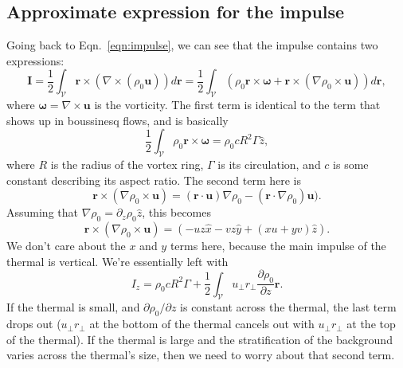\documentclass[onecolumn, amsmath, amsfonts, amssymb]{aastex62}
\newcommand{\grad}{\ensuremath{\nabla}}
\begin{document}
\subsection{Approximate expression for the impulse}
Going back to Eqn.~\ref{eqn:impulse}, we can see that the impulse contains two expressions:
\begin{equation}
\bm{I} = \frac{1}{2}\int_{\mathcal{V}}\bm{r}\times(\grad\times(\rho_0\bm{u}))d\bm{r} 
= \frac{1}{2} \int_{\mathcal{V}} \left(\rho_0 \bm{r}\times \bm{\omega} + \bm{r} \times(\grad\rho_0 \times \bm{u}) \right) d\bm{r},
\end{equation}
where $\bm{\omega} = \grad\times\bm{u}$ is the vorticity.  The first term is identical to the term that shows up
in boussinesq flows, and is basically \citep{saffman1970}
$$
\frac{1}{2} \int_{\mathcal{V}} \rho_0 \bm{r}\times \bm{\omega} = \rho_0 c R^2 \Gamma \hat{z},
$$
where $R$ is the radius of the vortex ring, $\Gamma$ is its circulation, and $c$ is some constant describing its
aspect ratio. The second term here is
$$
\bm{r}\times(\grad\rho_0 \times\bm{u}) = (\bm{r}\cdot\bm{u})\grad\rho_0 - (\bm{r}\cdot\grad\rho_0)\bm{u}).
$$
Assuming that $\grad \rho_0 = \partial_z \rho_0 \hat{z}$, this becomes
$$
\bm{r}\times(\grad\rho_0 \times\bm{u}) = (-uz\hat{x} - vz\hat{y} + (xu + yv)\hat{z}).
$$
We don't care about the $x$ and $y$ terms here, because the main impulse of the thermal is vertical. We're essentially left with
$$
I_z = \rho_0 c R^2 \Gamma + \frac{1}{2}\int_{\mathcal{V}} u_{\perp} r_{\perp} \frac{\partial \rho_0}{\partial z} \bm{r}.
$$
If the thermal is small, and $\partial \rho_0 /\partial z$ is constant across the thermal, the last term drops out
($u_{\perp} r_{\perp}$ at the bottom of the thermal cancels out with $u_{\perp} r_{\perp}$ at the top of the thermal).
If the thermal is large and the stratification of the background varies across the thermal's size, then we need to worry
about that second term.


\end{document}

